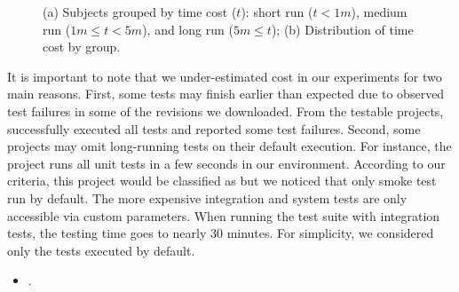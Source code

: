 \begin{figure}[ht]
\begin{subfigure}{0.25\textwidth}
        \caption{\label{fig:rq1-boxplot}}
    \end{subfigure}%
    \caption{(a) Subjects grouped by time cost ($t$): short run ($t <
    1m$), medium run ($1m \le t < 5m$), and long run ($5m \le t$); (b)
    Distribution of time cost by group.}
\end{figure}


It is important to note that we under-estimated cost in our
experiments for two main reasons.  First, some tests may finish
earlier than expected due to observed test failures in some of the
revisions we downloaded.  From the \numSubjs{} testable projects,
\numSubjsPass{} successfully executed all tests and \numSubjsFail{}
reported some test failures.  Second, some projects may omit
long-running tests on their default execution. For instance, the
project  runs all unit tests in a few
seconds in our environment.  According to our criteria, this project
would be classified as \shortg{} but we noticed that only smoke test
run by default.  The more expensive integration and system tests are
only accessible via custom parameters.  When running the test suite
with integration tests, the testing time goes to nearly 30 minutes.
For simplicity, we considered only the tests executed by default.

\begin{center}
\end{center}


\vspace{1ex}
\begin{itemize}
    \item \numRQB. \textbf{\RQB}
\end{itemize}

